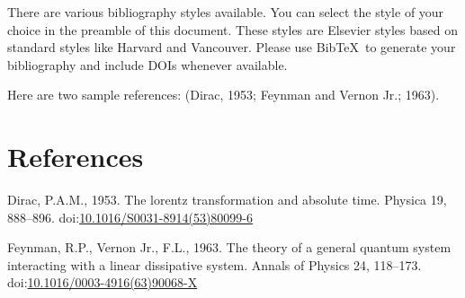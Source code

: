 \documentclass[]{elsarticle} %
\newlength{\cslhangindent}
\newlength{\cslentryspacingunit} %
\newenvironment{CSLReferences}[2] %
 {%
  \setlength{\parindent}{0pt}
  \ifodd #1
  \let\oldpar\par
  \def\par{\hangindent=\cslhangindent\oldpar}
  \fi
  \setlength{\parskip}{#2\cslentryspacingunit}
 }%
 {}
\begin{document}
There are various bibliography styles available. You can select the
style of your choice in the preamble of this document. These styles are
Elsevier styles based on standard styles like Harvard and Vancouver.
Please use BibTeX~to generate your bibliography and include DOIs
whenever available.

Here are two sample references: (Dirac, 1953; Feynman and Vernon Jr.;
1963).

\hypertarget{references}{%
\section*{References}\label{references}}

\hypertarget{refs}{}
\begin{CSLReferences}{1}{0}
\leavevmode{}%
Dirac, P.A.M., 1953. The lorentz transformation and absolute time.
Physica 19, 888--896.
doi:\href{https://doi.org/10.1016/S0031-8914(53)80099-6}{10.1016/S0031-8914(53)80099-6}

\leavevmode{}%
Feynman, R.P., Vernon Jr., F.L., 1963. The theory of a general quantum
system interacting with a linear dissipative system. Annals of Physics
24, 118--173.
doi:\href{https://doi.org/10.1016/0003-4916(63)90068-X}{10.1016/0003-4916(63)90068-X}

\end{CSLReferences}
\end{document}
